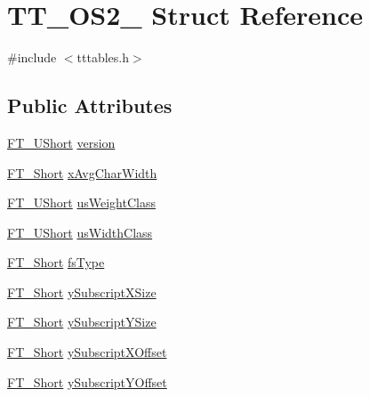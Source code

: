 \hypertarget{struct_t_t___o_s2__}{\section{T\-T\-\_\-\-O\-S2\-\_\- Struct Reference}
\label{struct_t_t___o_s2__}
}


{\ttfamily \#include $<$tttables.\-h$>$}

\subsection*{Public Attributes}
\begin{DoxyCompactItemize}
\item 
\hyperlink{fttypes_8h_a937f6c17cf5ffd09086d8610c37b9f58}{F\-T\-\_\-\-U\-Short} \hyperlink{struct_t_t___o_s2___a012ff79224cd25ae51837ca8937605c4}{version}
\item 
\hyperlink{fttypes_8h_aa7279be89046a2563cd3d4d6651fbdcf}{F\-T\-\_\-\-Short} \hyperlink{struct_t_t___o_s2___af903883918479780d17a72f6fee992bd}{x\-Avg\-Char\-Width}
\item 
\hyperlink{fttypes_8h_a937f6c17cf5ffd09086d8610c37b9f58}{F\-T\-\_\-\-U\-Short} \hyperlink{struct_t_t___o_s2___af4d8ab32a27382ea95b882d9e2615ec9}{us\-Weight\-Class}
\item 
\hyperlink{fttypes_8h_a937f6c17cf5ffd09086d8610c37b9f58}{F\-T\-\_\-\-U\-Short} \hyperlink{struct_t_t___o_s2___a8ef38b9f9c65a65aa6abf92e19236146}{us\-Width\-Class}
\item 
\hyperlink{fttypes_8h_aa7279be89046a2563cd3d4d6651fbdcf}{F\-T\-\_\-\-Short} \hyperlink{struct_t_t___o_s2___a8c37e3fa40954af5e5f9206eb6631eb7}{fs\-Type}
\item 
\hyperlink{fttypes_8h_aa7279be89046a2563cd3d4d6651fbdcf}{F\-T\-\_\-\-Short} \hyperlink{struct_t_t___o_s2___a3ae8d803a5055564e9f8a3926200e39c}{y\-Subscript\-X\-Size}
\item 
\hyperlink{fttypes_8h_aa7279be89046a2563cd3d4d6651fbdcf}{F\-T\-\_\-\-Short} \hyperlink{struct_t_t___o_s2___afb1b8ed1ea98badd4de58ff47b54c4c2}{y\-Subscript\-Y\-Size}
\item 
\hyperlink{fttypes_8h_aa7279be89046a2563cd3d4d6651fbdcf}{F\-T\-\_\-\-Short} \hyperlink{struct_t_t___o_s2___ab471c53b6e8a1c1f81cc410959bb5851}{y\-Subscript\-X\-Offset}
\item 
\hyperlink{fttypes_8h_aa7279be89046a2563cd3d4d6651fbdcf}{F\-T\-\_\-\-Short} \hyperlink{struct_t_t___o_s2___a94902b1f33ded0ea4c0555d54a0750fa}{y\-Subscript\-Y\-Offset}
\item 

\end{DoxyCompactItemize}
